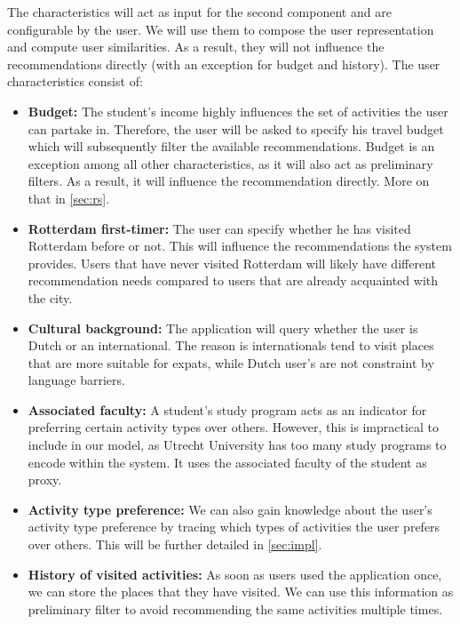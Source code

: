 \documentclass[11pt,a4paper,oneside]{article}
\begin{document}
The characteristics will act as input for the second component and are configurable by the user. We will use them to compose the user representation and compute user similarities. As a result, they will not influence the recommendations directly (with an exception for budget and history). The user characteristics consist of: 
\begin{itemize}
\item \textbf{Budget:} The student's income highly influences the set of activities the user can partake in. Therefore, the user will be asked to specify his travel budget which will subsequently filter the available recommendations. Budget is an exception among all other characteristics, as it will also act as preliminary filters. As a result, it will influence the recommendation directly. More on that in \autoref{sec:rs}.

\item \textbf{Rotterdam first-timer:} The user can specify whether he has visited Rotterdam before or not. This will influence the recommendations the system provides. Users that have never visited Rotterdam will likely have different recommendation needs compared to users that are already acquainted with the city.

\item \textbf{Cultural background:} The application will query whether the user is Dutch or an international. The reason is internationals tend to visit places that are more suitable for expats, while Dutch user's are not constraint by language barriers.

\item \textbf{Associated faculty:} A student's study program acts as an indicator for preferring certain activity types over others. However, this is impractical to include in our model, as Utrecht University has too many study programs to encode within the system. It uses the associated faculty of the student as proxy.

\item \textbf{Activity type preference:} We can also gain knowledge about the user's activity type preference by tracing which types of activities the user prefers over others. This will be further detailed in \autoref{sec:impl}.

\item \textbf{History of visited activities:} As soon as users used the application once, we can store the places that they have visited. We can use this information as preliminary filter to avoid recommending the same activities multiple times.  
\end{itemize}
\end{document}
